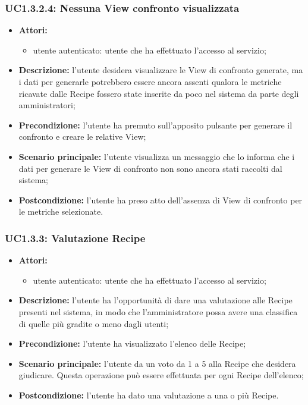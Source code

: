 \subsubsection{UC1.3.2.4: Nessuna View confronto visualizzata}
\begin{itemize}
	\item \textbf{Attori:}
	\begin{itemize}
		\item utente autenticato: utente che ha effettuato l'accesso al servizio;
	\end{itemize}
	\item \textbf{Descrizione:} l'utente desidera visualizzare le View di confronto generate, ma i dati per generarle potrebbero essere ancora assenti qualora le metriche ricavate dalle Recipe fossero state inserite da poco nel sistema da parte degli amministratori;
	\item \textbf{Precondizione:} l'utente ha premuto sull'apposito pulsante per generare il confronto e creare le relative View;
	\item \textbf{Scenario principale:} l'utente visualizza un messaggio che lo informa che i dati per generare le View di confronto non sono ancora stati raccolti dal sistema;
	\item \textbf{Postcondizione:} l'utente ha preso atto dell'assenza di View di confronto per le metriche selezionate.
\end{itemize}

\subsubsection{UC1.3.3: Valutazione Recipe}
\begin{itemize}
	\item \textbf{Attori:}
	\begin{itemize}
		\item utente autenticato: utente che ha effettuato l'accesso al servizio;
	\end{itemize}
	\item \textbf{Descrizione:} l'utente ha l'opportunità di dare una valutazione alle Recipe presenti nel sistema, in modo che l'amministratore possa avere una classifica di quelle più gradite o meno dagli utenti;
	\item \textbf{Precondizione:} l'utente ha visualizzato l'elenco delle Recipe;
	\item \textbf{Scenario principale:} l'utente da un voto da 1 a 5 alla Recipe che desidera giudicare. Questa operazione può essere effettuata per ogni Recipe dell'elenco;
	\item \textbf{Postcondizione:} l'utente ha dato una valutazione a una o più Recipe.
\end{itemize}

